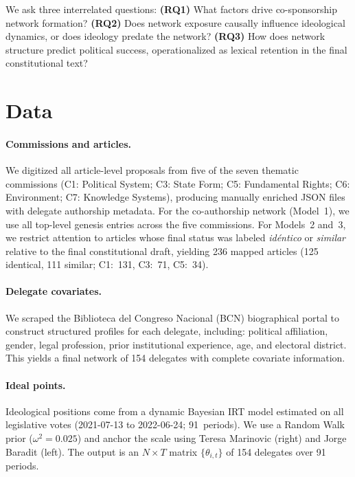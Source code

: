 \documentclass[11pt,a4paper]{article}
\begin{document}
We ask three interrelated questions: \textbf{(RQ1)} What factors drive co-sponsorship network formation? \textbf{(RQ2)} Does network exposure causally influence ideological dynamics, or does ideology predate the network? \textbf{(RQ3)} How does network structure predict political success, operationalized as lexical retention in the final constitutional text?

\section{Data}

\paragraph{Commissions and articles.} We digitized all article-level proposals from five of the seven thematic commissions (C1: Political System; C3: State Form; C5: Fundamental Rights; C6: Environment; C7: Knowledge Systems), producing manually enriched JSON files with delegate authorship metadata. For the co-authorship network (Model~1), we use all top-level genesis entries across the five commissions. For Models~2 and~3, we restrict attention to articles whose final status was labeled \emph{id\'entico} or \emph{similar} relative to the final constitutional draft, yielding 236 mapped articles (125 identical, 111 similar; C1:~131, C3:~71, C5:~34).

\paragraph{Delegate covariates.} We scraped the Biblioteca del Congreso Nacional (BCN) biographical portal to construct structured profiles for each delegate, including: political affiliation, gender, legal profession, prior institutional experience, age, and electoral district. This yields a final network of 154 delegates with complete covariate information.

\paragraph{Ideal points.} Ideological positions come from a dynamic Bayesian IRT model \citep{imai2016fast} estimated on all legislative votes (2021-07-13 to 2022-06-24; 91~periods). We use a Random Walk prior ($\omega^2 = 0.025$) and anchor the scale using Teresa Marinovic (right) and Jorge Baradit (left). The output is an $N \times T$ matrix $\{\theta_{i,t}\}$ of 154 delegates over 91 periods.
\end{document}
